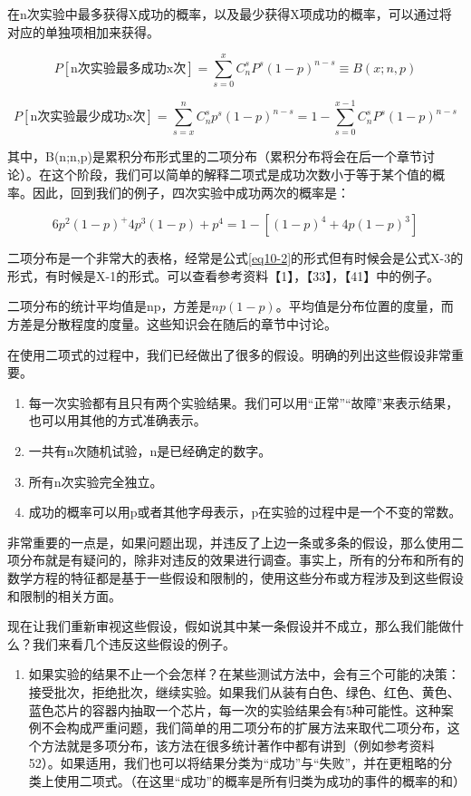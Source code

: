 \documentclass[cn,11pt,chinese]{elegantbook}
\begin{document}
{在n次实验中最多获得X成功的概率，以及最少获得X项成功的概率，可以通过将对应的单独项相加来获得。

\begin{equation}\label{eq10-2}
P[\mbox{n次实验最多成功x次}]=\sum_{s=0}^{x}C^s_nP^s(1-p)^{n-s}\equiv B(x;n,p) 
\end{equation}


\begin{equation}\label{eq10-3}
P[\mbox{n次实验最少成功x次}]=\sum_{s=x}^{n}C_n^sp^s(1-p)^{n-s}=1-\sum_{s=0}^{x-1}C_n^sP^s(1-p)^{n-s} 
\end{equation}

其中，B(n;n,p)是累积分布形式里的二项分布（累积分布将会在后一个章节讨论）。在这个阶段，我们可以简单的解释二项式是成功次数小于等于某个值的概率。因此，回到我们的例子，四次实验中成功两次的概率是：

$$
6p^2(1-p)^+4p^3(1-p)+p^4=1-[(1-p)^4+4p(1-p)^3]$$

二项分布是一个非常大的表格，经常是公式\ref{eq10-2}的形式但有时候会是公式X-3的形式，有时候是X-1的形式。可以查看参考资料【1】，【33】，【41】中的例子。

二项分布的统计平均值是np，方差是$np(1-p)$。平均值是分布位置的度量，而方差是分散程度的度量。这些知识会在随后的章节中讨论。

在使用二项式的过程中，我们已经做出了很多的假设。明确的列出这些假设非常重要。

\begin{enumerate}
	\item 每一次实验都有且只有两个实验结果。我们可以用“正常”“故障”来表示结果，也可以用其他的方式准确表示。
	\item 一共有n次随机试验，n是已经确定的数字。
\item 	所有n次实验完全独立。
\item 	成功的概率可以用p或者其他字母表示，p在实验的过程中是一个不变的常数。
\end{enumerate}

非常重要的一点是，如果问题出现，并违反了上边一条或多条的假设，那么使用二项分布就是有疑问的，除非对违反的效果进行调查。事实上，所有的分布和所有的数学方程的特征都是基于一些假设和限制的，使用这些分布或方程涉及到这些假设和限制的相关方面。

现在让我们重新审视这些假设，假如说其中某一条假设并不成立，那么我们能做什么？我们来看几个违反这些假设的例子。


\begin{enumerate}
	\item 如果实验的结果不止一个会怎样？在某些测试方法中，会有三个可能的决策：接受批次，拒绝批次，继续实验。如果我们从装有白色、绿色、红色、黄色、蓝色芯片的容器内抽取一个芯片，每一次的实验结果会有5种可能性。这种案例不会构成严重问题，我们简单的用二项分布的扩展方法来取代二项分布，这个方法就是多项分布，该方法在很多统计著作中都有讲到（例如参考资料52）。如果适用，我们也可以将结果分类为“成功”与“失败”，并在更粗略的分类上使用二项式。（在这里“成功”的概率是所有归类为成功的事件的概率的和）
	

\end{enumerate}}
\end{document}
